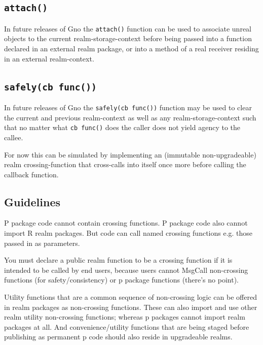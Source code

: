 \documentclass[12pt,a4paper]{article}
\newcommand{\passthrough}[1]{#1}
\begin{document}
\subsection{\texorpdfstring{\texttt{attach()}}{attach()}}\label{attach}

In future releases of Gno the \passthrough{\lstinline!attach()!}
function can be used to associate unreal objects to the current
realm-storage-context before being passed into a function declared in an
external realm package, or into a method of a real receiver residing in
an external realm-context.

\subsection{\texorpdfstring{\texttt{safely(cb\ func())}}{safely(cb func())}}\label{safelycb-func}

In future releases of Gno the
\passthrough{\lstinline!safely(cb func())!} function may be used to
clear the current and previous realm-context as well as any
realm-storage-context such that no matter what
\passthrough{\lstinline!cb func()!} does the caller does not yield
agency to the callee.

For now this can be simulated by implementing an (immutable
non-upgradeable) realm crossing-function that cross-calls into itself
once more before calling the callback function.

\subsection{Guidelines}\label{guidelines}

P package code cannot contain crossing functions. P package code also
cannot import R realm packages. But code can call named crossing
functions e.g. those passed in as parameters.

You must declare a public realm function to be a crossing function if it
is intended to be called by end users, because users cannot MsgCall
non-crossing functions (for safety/consistency) or p package functions
(there's no point).

Utility functions that are a common sequence of non-crossing logic can
be offered in realm packages as non-crossing functions. These can also
import and use other realm utility non-crossing functions; whereas p
packages cannot import realm packages at all. And convenience/utility
functions that are being staged before publishing as permanent p code
should also reside in upgradeable realms.
\end{document}
